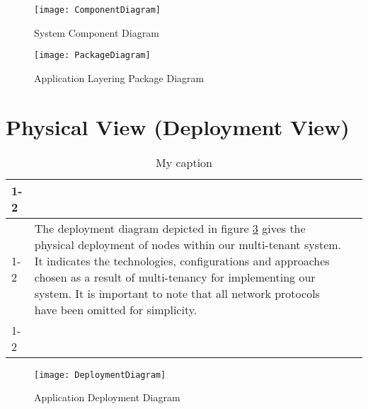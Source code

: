 \begin{figure}
\centering
\texttt{[image: ComponentDiagram]}
\caption{System Component Diagram}
\label{fig:componentdiagram}
\end{figure}


\begin{figure}
\centering
\texttt{[image: PackageDiagram]}
\caption{Application Layering Package Diagram}
\label{fig:packagediagram}
\end{figure}


\section{Physical View (Deployment View)}

\begin{table}[h]
\centering
\begin{tabularx}{\textwidth}{lXl}
\cline{1-2}
\multicolumn{2}{|c|}{\cellcolor[HTML]{EFEFEF}Physical View} &  \\ \cline{1-2}
\multicolumn{1}{|X|}{Figure \ref{fig:deploymentdiagram}} & \multicolumn{1}{l|}{The deployment diagram depicted in figure \ref{fig:deploymentdiagram} gives the physical deployment of nodes within our multi-tenant system. It indicates the technologies, configurations and approaches chosen as a result of multi-tenancy for implementing our system. It is important to note that all network protocols have been omitted for simplicity.} &  \\ \cline{1-2}
\cline{1-2}
\end{tabularx}
\caption{My caption}
\label{my-label}
\end{table}


\begin{figure}
\centering
\texttt{[image: DeploymentDiagram]}
\caption{Application Deployment Diagram}
\label{fig:deploymentdiagram}
\end{figure}

